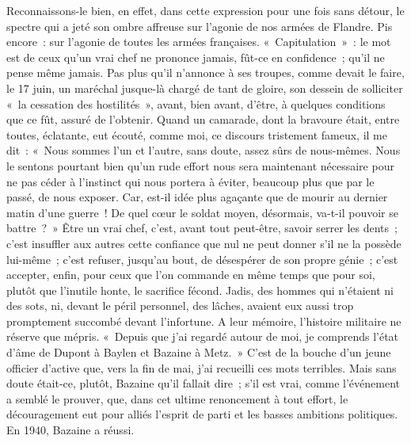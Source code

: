 \documentclass[french,twoside]{book} %
\begin{document}
Reconnaissons-le bien, en effet, dans cette expression pour une fois sans détour, le spectre qui a jeté son ombre affreuse sur l’agonie de nos armées de Flandre. Pis encore : sur l’agonie de toutes les armées françaises. « Capitulation » : le mot est de ceux qu’un vrai chef ne prononce jamais, fût-ce en confidence ; qu’il ne pense même jamais. Pas plus qu’il n’annonce à ses troupes, comme devait le faire, le 17 juin, un maréchal jusque-là chargé de tant de gloire, son dessein de solliciter « la cessation des hostilités », avant, bien avant, d’être, à quelques conditions que ce fût, assuré de l’obtenir. Quand un camarade, dont la bravoure était, entre toutes, éclatante, eut écouté, comme moi, ce discours tristement fameux, il me dit : « Nous sommes l’un et l’autre, sans doute, assez sûrs de nous-mêmes. Nous le sentons pourtant bien qu’un rude effort nous sera maintenant nécessaire pour ne pas céder à l’instinct qui nous portera à éviter, beaucoup plus que par le passé,   de nous exposer. Car, est-il idée plus agaçante que de mourir au dernier matin d’une guerre ! De quel cœur le soldat moyen, désormais, va-t-il pouvoir se battre ? » Être un vrai chef, c’est, avant tout peut-être, savoir serrer les dents ; c’est insuffler aux autres cette confiance que nul ne peut donner s’il ne la possède lui-même ; c’est refuser, jusqu’au bout, de désespérer de son propre génie ; c’est accepter, enfin, pour ceux que l’on commande en même temps que pour soi, plutôt que l’inutile honte, le sacrifice fécond. Jadis, des hommes qui n’étaient ni des sots, ni, devant le péril personnel, des lâches, avaient eux aussi trop promptement succombé devant l’infortune. A leur mémoire, l’histoire militaire ne réserve que mépris. « Depuis que j’ai regardé autour de moi, je comprends l’état d’âme de Dupont à Baylen et Bazaine à Metz. » C’est de la bouche d’un jeune officier d’active que, vers la fin de mai, j’ai recueilli ces mots terribles. Mais sans doute était-ce, plutôt, Bazaine qu’il fallait dire ; s’il est vrai, comme l’événement a semblé le prouver, que, dans cet ultime renoncement à tout effort, le découragement eut pour alliés l’esprit de parti et les basses ambitions politiques. En 1940, Bazaine a réussi.\par
\end{document}
